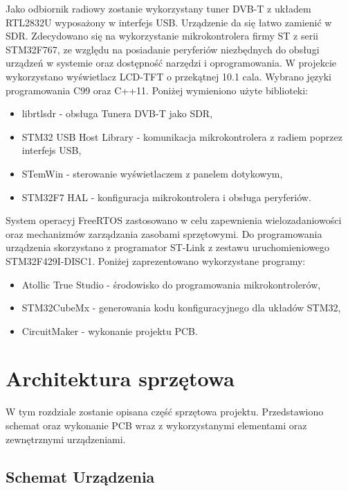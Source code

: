 \documentclass[eng,printmode]{mgr}
\begin{document}
Jako odbiornik radiowy zostanie wykorzystany tuner DVB-T z układem RTL2832U wyposażony w interfejs USB. Urządzenie da się łatwo zamienić w SDR. Zdecydowano się na wykorzystanie mikrokontrolera firmy ST z serii STM32F767, ze względu na posiadanie peryferiów niezbędnych do obsługi urządzeń w systemie oraz dostępność narzędzi i oprogramowania. W projekcie wykorzystano wyświetlacz LCD-TFT o przekątnej 10.1 cala.
Wybrano języki programowania C99 oraz C++11.
Poniżej wymieniono użyte biblioteki:
\begin{itemize}
  \item librtlsdr - obsługa Tunera DVB-T jako SDR,
  \item STM32 USB Host Library - komunikacja mikrokontrolera z radiem poprzez interfejs USB,
  \item STemWin - sterowanie wyświetlaczem z panelem dotykowym,
  \item STM32F7 HAL - konfiguracja mikrokontrolera i obsługa peryferiów.
\end{itemize}


System operacyj FreeRTOS zastosowano w celu zapewnienia wielozadaniowości oraz mechanizmów zarządzania zasobami sprzętowymi. Do programowania urządzenia skorzystano z programator ST-Link z zestawu uruchomieniowego STM32F429I-DISC1. Poniżej zaprezentowano wykorzystane programy:

\begin{itemize}
  \item Atollic True Studio - środowisko do programowania mikrokontrolerów,
  \item STM32CubeMx - generowania kodu konfiguracyjnego dla układów STM32,
  \item CircuitMaker - wykonanie projektu PCB.
\end{itemize}

\chapter{ Architektura sprzętowa}
W tym rozdziale zostanie opisana część sprzętowa projektu. Przedstawiono schemat oraz wykonanie PCB wraz z wykorzystanymi elementami oraz zewnętrznymi urządzeniami.


\section{ Schemat Urządzenia}
\end{document}
